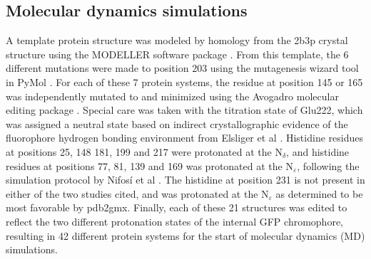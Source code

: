 \subsection{Molecular dynamics simulations}

A template protein structure was modeled by homology from the 2b3p crystal structure\cite{Pedelacq2006} using the MODELLER software package \cite{Marti-Renom2000}.
From this template, the 6 different mutations were made to position 203 using the mutagenesis wizard tool in PyMol \cite{DeLano2002}.
For each of these 7 protein systems, the residue at position 145 or 165 was independently mutated to \pCNF{} and minimized using the Avogadro molecular editing package \cite{Hanwell2012}. 
Special care was taken with the titration state of Glu222, which was assigned a neutral state based on indirect crystallographic evidence of the fluorophore hydrogen bonding environment from Elsliger et al \cite{Elsliger1999}. 
Histidine residues at positions 25, 148 181, 199 and 217 were protonated at the N$_{\delta}$, and histidine residues at positions 77, 81, 139 and 169 was protonated at the N$_{\varepsilon}$, following the simulation protocol by Nifos\'i et al \cite{Nifosi2003}.
The histidine at position 231 is not present in either of the two studies cited, and was protonated at the N$_{\varepsilon}$ as determined to be most favorable by pdb2gmx. 
Finally, each of these 21 structures was edited to reflect the two different protonation states of the internal GFP chromophore, resulting in 42 different protein systems for the start of molecular dynamics (MD) simulations. 

